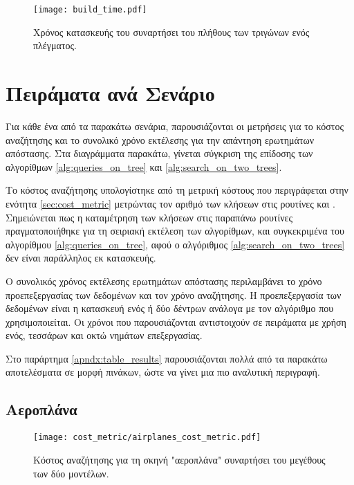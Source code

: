 \begin{figure}[h]
    \centering
    \texttt{[image: build\_time.pdf]}
    \caption[Χρόνοι Κατασκευής του ]{
        Χρόνος κατασκευής του  συναρτήσει 
        του πλήθους των τριγώνων ενός πλέγματος.
    }
    \label{fig:build_time}
\end{figure}

\section{Πειράματα ανά Σενάριο}
Για κάθε ένα από τα παρακάτω σενάρια, παρουσιάζονται οι 
μετρήσεις για το κόστος αναζήτησης και το συνολικό χρόνο 
εκτέλεσης για την απάντηση ερωτημάτων απόστασης.
Στα διαγράμματα παρακάτω, γίνεται σύγκριση της επίδοσης των αλγορίθμων 
\ref{alg:queries_on_tree} και \ref{alg:search_on_two_trees}.

Το κόστος αναζήτησης υπολογίστηκε από τη μετρική κόστους 
που περιγράφεται στην ενότητα \ref{sec:cost_metric} 
μετρώντας τον αριθμό των κλήσεων στις ρουτίνες 
 και .
Σημειώνεται πως η καταμέτρηση των κλήσεων στις παραπάνω ρουτίνες 
πραγματοποιήθηκε για τη σειριακή εκτέλεση των αλγορίθμων, και συγκεκριμένα 
του αλγορίθμου \ref{alg:queries_on_tree}, αφού ο αλγόριθμος 
\ref{alg:search_on_two_trees} δεν είναι παράλληλος εκ κατασκευής.

Ο συνολικός χρόνος εκτέλεσης ερωτημάτων απόστασης περιλαμβάνει 
το χρόνο προεπεξεργασίας των δεδομένων και τον χρόνο αναζήτησης.
Η προεπεξεργασία των δεδομένων είναι η κατασκευή ενός ή δύο δέντρων 
ανάλογα με τον αλγόριθμο που χρησιμοποιείται.
Οι χρόνοι που παρουσιάζονται αντιστοιχούν σε πειράματα με χρήση 
ενός, τεσσάρων και οκτώ νημάτων επεξεργασίας.

Στο παράρτημα \ref{apndx:table_results} παρουσιάζονται πολλά από 
τα παρακάτω αποτελέσματα σε μορφή πινάκων, ώστε να γίνει μια πιο 
αναλυτική περιγραφή.

\subsection{Αεροπλάνα}

\begin{figure}[H]
    \centering
    \texttt{[image: cost\_metric/airplanes\_cost\_metric.pdf]}
    \caption[Κόστος Αναζήτησης για "αεροπλάνα"] {
        Κόστος αναζήτησης για τη σκηνή "αεροπλάνα" συναρτήσει 
        του μεγέθους των δύο μοντέλων.
    }
\end{figure}

